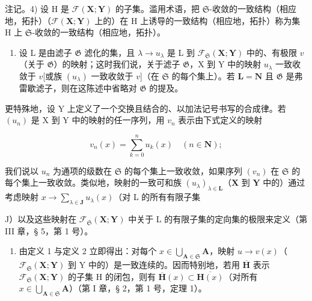 注记。4) 设 H 是 \(\mathcal{F}(\mathbf{X};\mathbf{Y})\) 的子集。滥用术语，把 \(\mathfrak{S}\)-收敛的一致结构（相应地，拓扑）（\(\mathcal{F}(\mathbf{X};\mathbf{Y})\) 上的）在 H 上诱导的一致结构（相应地，拓扑）称为集 H 上 \(\mathfrak{S}\)-收敛的一致结构（相应地，拓扑）。

\begin{enumerate}
\def\labelenumi{\arabic{enumi})}
\setcounter{enumi}{4}
\tightlist
\item
  设 L 是由滤子 \(\mathfrak{G}\) 滤化的集，且 \(\lambda \to u_{\lambda}\) 是 L 到 \(\mathcal{F}_{\mathfrak{S}}(\mathbf{X};\mathbf{Y})\) 中的、有极限 \(v\)（关于 \(\mathfrak{G}\)）的映射；这时我们说，关于滤子 \(\mathfrak{G}\)，X 到 Y 中的映射 \(u_{\lambda}\) 一致收敛于 \(v\){[}或族 \((u_{\lambda})\) 一致收敛于 \(v\){]}（在 \(\mathfrak{S}\) 的每个集上）。若 \(\mathbf{L} = \mathbf{N}\) 且 \(\mathfrak{G}\) 是弗雷歇滤子，则在这陈述中省略对 \(\mathfrak{G}\) 的提及。
\end{enumerate}

更特殊地，设 Y 上定义了一个交换且结合的、以加法记号书写的合成律。若 \((u_{n})\) 是 X 到 Y 中的映射的任一序列，用 \(v_{n}\) 表示由下式定义的映射

\[
v _ {n} (x) = \sum_ {k = 0} ^ {n} u _ {k} (x) \quad (n \in \mathbf {N});
\]

我们说以 \(u_n\) 为通项的级数在 \(\mathfrak{S}\) 的每个集上一致收敛，如果序列 \((v_n)\) 在 \(\mathfrak{S}\) 的每个集上一致收敛。类似地，映射的一致可和族 \((u_\lambda)_{\lambda \in \mathbf{L}}\)（\(\mathbf{X}\) 到 \(\mathbf{Y}\) 中的）通过考虑映射 \(x \to \sum_{\lambda \in \mathbf{J}} u_\lambda(x)\)（对 L 的所有有限子集

J）以及这些映射在 \(\mathcal{F}_{\mathfrak{S}}(\mathbf{X};\mathbf{Y})\) 中关于 L 的有限子集的定向集的极限来定义（第 III 章，§ 5，第 1 号）。

\begin{enumerate}
\def\labelenumi{\arabic{enumi})}
\setcounter{enumi}{5}
\tightlist
\item
  由定义 1 与定义 2 立即得出：对每个 \(x \in \bigcup_{\mathbf{A} \in \mathfrak{S}} \mathbf{A}\)，映射 \(u \to v(x)\)（\(\mathcal{F}_{\mathfrak{S}}(\mathbf{X}; \mathbf{Y})\) 到 Y 中的）是一致连续的。因而特别地，若用 \(\overline{\mathbf{H}}\) 表示 \(\mathcal{F}_{\mathfrak{S}}(\mathbf{X}; \mathbf{Y})\) 的子集 H 的闭包，则有 \(\overline{\mathbf{H}}(x) \subset \overline{\mathbf{H}(x)}\)（对所有 \(x \in \bigcup_{\mathbf{A} \in \mathfrak{S}} \mathbf{A}\)）（第 I 章，§ 2，第 1 号，定理 1）。
\end{enumerate}

